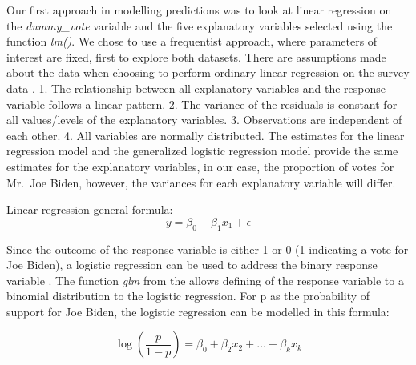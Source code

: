 \documentclass[
]{article}
\begin{document}
Our first approach in modelling predictions was to look at linear regression on the \emph{dummy\_vote} variable and the five explanatory variables selected using the function \emph{lm()}. We chose to use a frequentist approach, where parameters of interest are fixed, first to explore both datasets. There are assumptions made about the data when choosing to perform ordinary linear regression on the survey data .
1. The relationship between all explanatory variables and the response variable follows a linear pattern.
2. The variance of the residuals is constant for all values/levels of the explanatory variables.
3. Observations are independent of each other.
4. All variables are normally distributed.
The estimates for the linear regression model and the generalized logistic regression model provide the same estimates for the explanatory variables, in our case, the proportion of votes for Mr.~Joe Biden, however, the variances for each explanatory variable will differ.

Linear regression general formula:
\[ y = \beta_0 + \beta_1x_1 + \epsilon \]

Since the outcome of the response variable is either 1 or 0 (1 indicating a vote for Joe Biden), a logistic regression can be used to address the binary response variable \citep{citeAndrew}. The function \emph{glm} from the allows defining of the response variable to a binomial distribution to the logistic regression. For p as the probability of support for Joe Biden, the logistic regression can be modelled in this formula:

\[ \log(\frac{p}{1-p}) = \beta_0 + \beta_2x_2 + ... + \beta_kx_k\]
\end{document}
